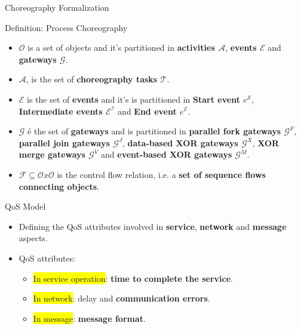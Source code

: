 \documentclass[xcolor=svgnames]{beamer}
\begin{document}
  \begin{frame}{Choreography Formalization}
    \begin{block}{ Definition: Process Choreography }\vspace{-.3\baselineskip}

      \begin{itemize}
	  \item <2->\textbf{$\mathcal{O}$} is a set of objects and it's partitioned in \textbf{activities $\mathcal{A}$}, \textbf{events $\mathcal{E}$} and \textbf{gateways $\mathcal{G}$}.
	  \item <3-> \textbf{$\mathcal{A}$}, is the set of \textbf{choreography tasks $\mathcal{T}$}.
	  \item <4-> \textbf{$\mathcal{E}$} is the set of \textbf{events} and  it's is partitioned in \textbf{Start event {$e^\mathcal{S}$}}, \textbf{Intermediate
	events $\mathcal{E^I}$} and \textbf{End event {$e^\mathcal{E}$}}.
	  \item <5-> \textbf{$\mathcal{G}$} é the set of \textbf{gateways} and is partitioned in \textbf{parallel fork gateways $\mathcal{G}^F$},
	\textbf{parallel join gateways $\mathcal{G}^J$}, \textbf{data-based XOR gateways $\mathcal{G}^X$}, \textbf{XOR merge gateways $\mathcal{G}^V$} and \textbf{event-based
	XOR gateways $\mathcal{G}^M$}.
	\item <6-> \textbf{$\mathcal{F} \subseteq \mathcal{O}x\mathcal{O}$} is the control flow relation, i.e. a \textbf{set of sequence flows connecting objects}.
      \end{itemize}

    \end{block}

  \end{frame}


  \begin{frame}{QoS Model}
    \begin{itemize} %
	\item Defining the QoS attributes involved in \textbf{service}, \textbf{network} and \textbf{message} aspects.
	\item QoS attributes:
	    \begin{itemize}
	      \item \colorbox{yellow}{In service operation}: \textbf{time to complete the service}.
	      \item \colorbox{yellow}{In network}: delay and \textbf{communication errors}.
	      \item \colorbox{yellow}{In message}: \textbf{message format}.
	    \end{itemize}
    \end{itemize}
  \end{frame}
\end{document}
